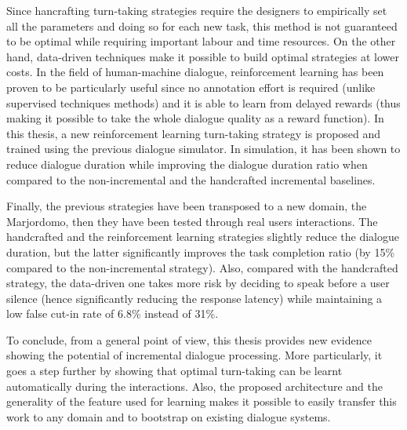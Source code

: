         Since hancrafting turn-taking strategies require the designers to empirically set all the parameters and doing so for each new task, this method is not guaranteed to be optimal while requiring important labour and time resources. On the other hand, data-driven techniques make it possible to build optimal strategies at lower costs. In the field of human-machine dialogue, reinforcement learning has been proven to be particularly useful since no annotation effort is required (unlike supervised techniques methods) and it is able to learn from delayed rewards (thus making it possible to take the whole dialogue quality as a reward function). In this thesis, a new reinforcement learning turn-taking strategy is proposed and trained using the previous dialogue simulator. In simulation, it has been shown to reduce dialogue duration while improving the dialogue duration ratio when compared to the non-incremental and the handcrafted incremental baselines.

        Finally, the previous strategies have been transposed to a new domain, the Marjordomo, then they have been tested through real users interactions. The handcrafted and the reinforcement learning strategies slightly reduce the dialogue duration, but the latter significantly improves the task completion ratio (by 15\% compared to the non-incremental strategy). Also, compared with the handcrafted strategy, the data-driven one takes more risk by deciding to speak before a user silence (hence significantly reducing the response latency) while maintaining a low false cut-in rate of 6.8\% instead of 31\%.

        To conclude, from a general point of view, this thesis provides new evidence showing the potential of incremental dialogue processing. More particularly, it goes a step further by showing that optimal turn-taking can be learnt automatically during the interactions. Also, the proposed architecture and the generality of the feature used for learning makes it possible to easily transfer this work to any domain and to bootstrap on existing dialogue systems.
        


        
	
	
